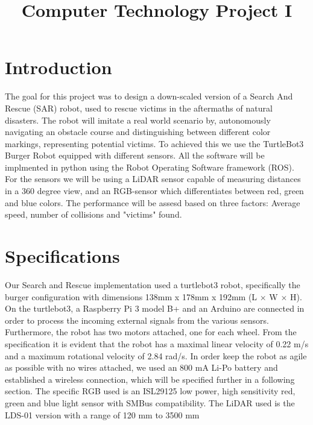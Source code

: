 \documentclass[conference]{IEEEtran}
\begin{document}
\title{Computer Technology Project I\\}

\author{
\and
{}
}

\maketitle

\begin{abstract}
\end{abstract}

\section{Introduction}
The goal for this project was to design a down-scaled version of a Search And Rescue (SAR) robot, used to rescue victims in the aftermaths of natural disasters.
The robot will imitate a real world scenario by, autonomously navigating an obstacle course and distinguishing between different color markings, representing potential victims. To achieved this we use the TurtleBot3 Burger Robot equipped with different sensors.
All the software will be implmented in python using the Robot Operating Software framework (ROS). For the sensors we will be using a LiDAR sensor capable of measuring distances in a 360 degree view, and an RGB-sensor which differentiates between red, green and blue colors. 
The performance will be assesd based on three factors: Average speed, number of collisions and "victims" found.

\section{Specifications}
Our Search and Rescue implementation used a turtlebot3 robot, specifically the burger configuration with dimensions 138mm x 178mm x 192mm (L $\times$ W $\times$ H)\cite{b1}.
On the turtlebot3, a Raspberry Pi 3 model B+ and an Arduino are connected in order to process the incoming external signals from the various sensors.
Furthermore, the robot has two motors attached, one for each wheel. From the specification it is evident that the robot has a maximal linear velocity of 0.22 m/s
and a maximum rotational velocity of 2.84 rad/s. In order keep the robot as agile as possible with no wires attached, we used an 800 mA Li-Po battery and established a wireless connection, which will be specified further in a following section.
The specific RGB used is an ISL29125 low power, high sensitivity red, green and blue light sensor with SMBus compatibility\cite{b2}.
The LiDAR used is the LDS-01 version with a range of 120 mm to 3500 mm \cite{b3}
\end{document}
